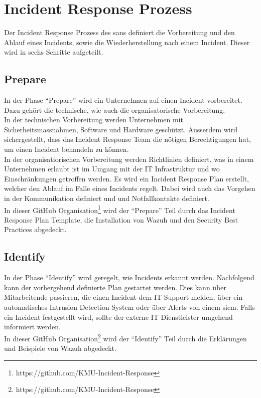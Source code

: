 \section{Incident Response Prozess}
Der Incident Response Prozess des \acrfull{sans} definiert die Vorbereitung und den Ablauf eines Incidents, sowie die Wiederherstellung nach einem Incident.
Dieser wird in sechs Schritte aufgeteilt. 

\subsection{Prepare}
In der Phase ``Prepare'' wird ein Unternehmen auf einen Incident vorbereitet. 
Dazu gehört die technische, wie auch die organisatorische Vorbereitung.\\

In der technischen Vorbereitung werden Unternehmen mit Sicherheitsmassnahmen, Software und Hardware geschützt.
Ausserdem wird sichergestellt, dass das Incident Response Team die nötigen Berechtigungen hat, um einen Incident behandeln zu können.\\

In der organisatiorischen Vorbereitung werden Richtlinien definiert, was in einem Unternehmen erlaubt ist im Umgang mit der IT Infrastruktur und wo Einschränkungen getroffen werden.
Es wird ein Incident Response Plan erstellt, welcher den Ablauf im Falle eines Incidents regelt.
Dabei wird auch das Vorgehen in der Kommunikation definiert und und Notfallkontakte definiert.\\

In dieser GitHub Organisation\footnote{https://github.com/KMU-Incident-Response} wird der ``Prepare'' Teil durch das Incident Response Plan Template, die Installation von Wazuh und den Security Best Practices abgedeckt.

\subsection{Identify}
In der Phase ``Identify'' wird geregelt, wie Incidents erkannt werden. Nachfolgend kann der vorhergehend definierte Plan gestartet werden.
Dies kann über Mitarbeitende passieren, die einen Incident dem IT Support melden, über ein automatisches Intrusion Detection System oder über Alerts von einem \acrshort{siem}.
Falls ein Incident festgestellt wird, sollte der externe IT Dienstleister umgehend informiert werden.\\

In dieser GitHub Organisation\footnote{https://github.com/KMU-Incident-Response} wird der ``Identify'' Teil durch die Erklärungen und Beispiele von Wazuh abgedeckt.

